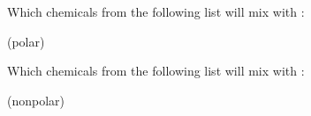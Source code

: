 \documentclass[main.tex]{subfiles}
\begin{document}
\begin{multicols*}{2}
\begin{question}[ID=\the\value{numA}]
Which chemicals from the following list will mix with :
\begin{inparaenum}[(a)]
\item  {}  %
\item  {}  %
\item {}  %
\end{inparaenum}
\end{question}
\begin{solution}
    (polar)
\hspace{0.1cm}\end{solution}

\begin{question}[ID=\the\value{numA}]
Which chemicals from the following list will mix with :
\begin{inparaenum}[(a)]
\item  {}  %
\item   {}  %
\item {}  %
\end{inparaenum}
\end{question}
\begin{solution}
     (nonpolar)
\hspace{0.1cm}\end{solution}




\end{multicols*}
\end{document}
